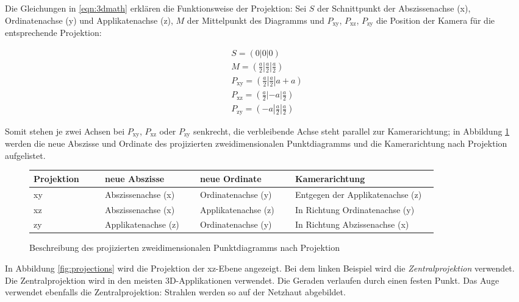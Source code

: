 Die Gleichungen in \ref{eqn:3dmath} erklären die Funktionsweise der Projektion: Sei $S$ der Schnittpunkt der Abszissenachse (x), Ordinatenachse (y) und Applikatenachse (z), $M$ der Mittelpunkt des Diagramms und $P_{\text{xy}}$, $P_{\text{xz}}$, $P_{\text{zy}}$ die Position der Kamera für die entsprechende Projektion:

\begin{equation}
\begin{gathered}
S = (0|0|0)
\\
M = (\frac{a}{2} | \frac{a}{2} | \frac{a}{2})
\\
P_{\text{xy}} = (\frac{a}{2} | \frac{a}{2}| a + a)
\\
P_{\text{xz}} = (\frac{a}{2} | -a | \frac{a}{2})
\\
P_{\text{zy}} = (-a | \frac{a}{2}| \frac{a}{2})
\end{gathered}
\label{eqn:3dmath}
\end{equation}

Somit stehen je zwei Achsen bei $P_{\text{xy}}$, $P_{\text{xz}}$ oder $P_{\text{zy}}$ senkrecht, die verbleibende Achse steht parallel zur Kamerarichtung; in Abbildung \ref{fig:3dtable} werden die neue Abszisse und Ordinate des projizierten zweidimensionalen Punktdiagramms und die Kamerarichtung nach Projektion aufgelistet.

\begin{figure}[H]
	\centering
	\begin{tabular}{ | m{0.15\linewidth} | m{0.2\linewidth} |m{0.2\linewidth} | m{0.3\linewidth} |}
		\hline
		\textbf{Projektion} & \textbf{neue Abszisse} & \textbf{neue Ordinate} & \textbf{Kamerarichtung}\\ \hline
		xy & Abszissenachse (x) & Ordinatenachse (y) & Entgegen der Applikatenachse (z) \\ \hline
		xz & Abszissenachse (x) & Applikatenachse (z) & In Richtung Ordinatenachse (y)\\ \hline
		zy & Applikatenachse (z) & Ordinatenachse (y) & In Richtung Abzissenachse (x) \\ \hline
	\end{tabular}
	\caption{Beschreibung des projizierten zweidimensionalen Punktdiagramms nach Projektion}
	\label{fig:3dtable}
\end{figure}

In Abbildung \ref{fig:projections} wird die Projektion der xz-Ebene angezeigt. Bei dem linken Beispiel wird die \textit{Zentralprojektion} verwendet. Die Zentralprojektion wird in den meisten 3D-Applikationen verwendet. Die Geraden verlaufen durch einen festen Punkt. Das Auge verwendet ebenfalls die Zentralprojektion: Strahlen werden so auf der Netzhaut abgebildet.

